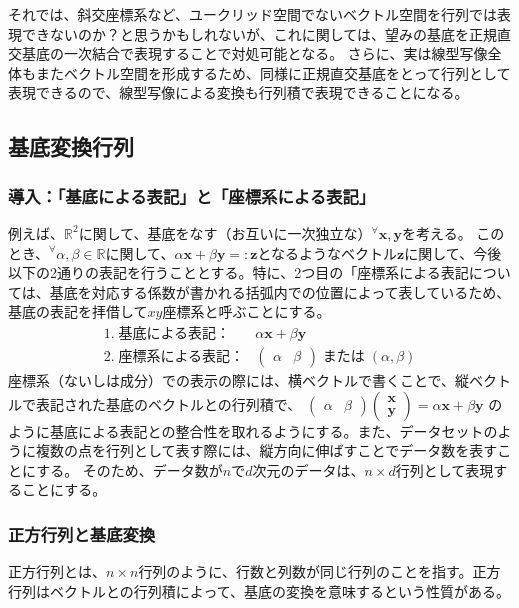 \documentclass[10pt]{ujarticle}
\begin{document}
それでは、斜交座標系など、ユークリッド空間でないベクトル空間を行列では表現できないのか？と思うかもしれないが、これに関しては、望みの基底を正規直交基底の一次結合で表現することで対処可能となる。
さらに、実は線型写像全体もまたベクトル空間を形成するため、同様に正規直交基底をとって行列として表現できるので、線型写像による変換も行列積で表現できることになる。


\subsection{基底変換行列}
\subsubsection{導入：「基底による表記」と「座標系による表記」}
例えば、$\mathbb{R}^2$に関して、基底をなす（お互いに一次独立な）$^\forall\mathbf{x,y}$を考える。
このとき、$^\forall\alpha,\beta\in\mathbb{R}$に関して、$\alpha\mathbf{x}+\beta\mathbf{y}=:\mathbf{z}$となるようなベクトル$\mathbf{z}$に関して、今後以下の2通りの表記を行うこととする。特に、2つ目の「座標系による表記については、基底を対応する係数が書かれる括弧内での位置によって表しているため、基底の表記を拝借して$xy$座標系と呼ぶことにする。
$$
\begin{aligned}
  1.\;\text{基底による表記：}&\alpha\mathbf{x}+\beta\mathbf{y}\\
  2.\;\text{座標系による表記：}&\begin{pmatrix}\alpha&\beta\end{pmatrix}\;\text{または}\;(\alpha,\beta)
\end{aligned}
$$
座標系（ないしは成分）での表示の際には、横ベクトルで書くことで、縦ベクトルで表記された基底のベクトルとの行列積で、
$\begin{pmatrix}\alpha&\beta\end{pmatrix}\begin{pmatrix}\mathbf{x}\\\mathbf{y}\end{pmatrix}=\alpha\mathbf{x}+\beta\mathbf{y}$
のように基底による表記との整合性を取れるようにする。また、データセットのように複数の点を行列として表す際には、縦方向に伸ばすことでデータ数を表すことにする。
そのため、データ数が$n$で$d$次元のデータは、$n\times d$行列として表現することにする。

\subsubsection{正方行列と基底変換}
正方行列とは、$n\times n$行列のように、行数と列数が同じ行列のことを指す。正方行列はベクトルとの行列積によって、基底の変換を意味するという性質がある。
\end{document}
